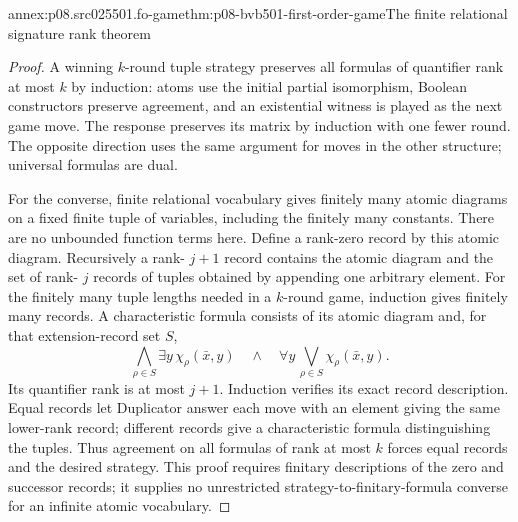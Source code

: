\begin{annexitem}{annex:p08.src025501.fo-game}{thm:p08-bvb501-first-order-game}{The finite relational signature rank theorem}
\begin{proof}
A winning \(k\)-round tuple strategy preserves all formulas of quantifier
rank at most \(k\) by induction: atoms use the initial partial
isomorphism, Boolean constructors preserve agreement, and an existential
witness is played as the next game move. The response preserves its
matrix by induction with one fewer round. The opposite direction uses
the same argument for moves in the other structure; universal formulas
are dual.

For the converse, finite relational vocabulary gives finitely many
atomic diagrams on a fixed finite tuple of variables, including the
finitely many constants. There are no unbounded function terms here.
Define a rank-zero record by this atomic diagram. Recursively a rank-
\(j+1\) record contains the atomic diagram and the set of rank-
\(j\) records of tuples obtained by appending one arbitrary element.
For the finitely many tuple lengths needed in a \(k\)-round game,
induction gives finitely many records. A characteristic formula consists
of its atomic diagram and, for that extension-record set \(S\),
\[
 \bigwedge_{\rho\in S}\exists y\,\chi_\rho(\bar x,y)
 \quad\land\quad
 \forall y\,\bigvee_{\rho\in S}\chi_\rho(\bar x,y).
\]
Its quantifier rank is at most \(j+1\). Induction verifies its exact
record description. Equal records let Duplicator answer each move with
an element giving the same lower-rank record; different records give
a characteristic formula distinguishing the tuples. Thus agreement on
all formulas of rank at most \(k\) forces equal records and the desired
strategy. This proof requires finitary descriptions of the zero and
successor records; it supplies no unrestricted strategy-to-finitary-formula
converse for an infinite atomic vocabulary.
\end{proof}
\end{annexitem}

